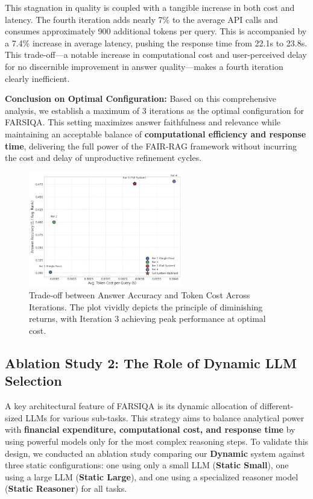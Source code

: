 \documentclass[11pt]{article}
\begin{document}
This stagnation in quality is coupled with a tangible increase in both cost and latency. The fourth iteration adds nearly 7\% to the average API calls and consumes approximately 900 additional tokens per query. This is accompanied by a 7.4\% increase in average latency, pushing the response time from 22.1s to 23.8s. This trade-off---a notable increase in computational cost and user-perceived delay for no discernible improvement in answer quality---makes a fourth iteration clearly inefficient.

\textbf{Conclusion on Optimal Configuration:} Based on this comprehensive analysis, we establish a maximum of 3 iterations as the optimal configuration for FARSIQA. This setting maximizes answer faithfulness and relevance while maintaining an acceptable balance of \textbf{computational efficiency and response time}, delivering the full power of the FAIR-RAG framework without incurring the cost and delay of unproductive refinement cycles.

\begin{figure}[t]
\centering
\includegraphics[width=0.6\textwidth]{figure_3.png}
\caption{Trade-off between Answer Accuracy and Token Cost Across Iterations. The plot vividly depicts the principle of diminishing returns, with Iteration 3 achieving peak performance at optimal cost.}
\label{fig:iteration-cost-tradeoff}
\end{figure}

\subsection{Ablation Study 2: The Role of Dynamic LLM Selection}

A key architectural feature of FARSIQA is its dynamic allocation of different-sized LLMs for various sub-tasks. This strategy aims to balance analytical power with \textbf{financial expenditure, computational cost, and response time} by using powerful models only for the most complex reasoning steps. To validate this design, we conducted an ablation study comparing our \textbf{Dynamic} system against three static configurations: one using only a small LLM (\textbf{Static Small}), one using a large LLM (\textbf{Static Large}), and one using a specialized reasoner model (\textbf{Static Reasoner}) for all tasks.
\end{document}
